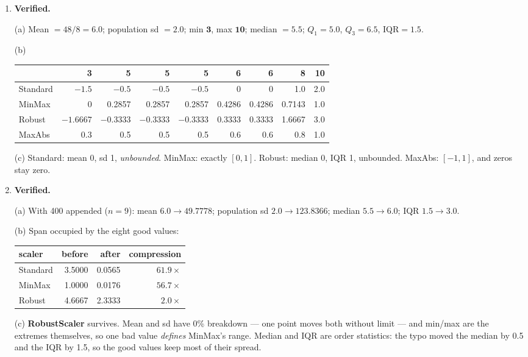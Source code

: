 \documentclass[11pt,a4paper]{article}
\newcommand{\A}[1]{\item[\textbf{#1}]}
\begin{document}
\begin{enumerate}[leftmargin=1.9cm]
\A{U4.62} \textbf{Verified.}
\begin{answerbox}
(a) Mean $= 48/8 = \mathbf{6.0}$; population sd $= \mathbf{2.0}$;
min $\mathbf{3}$, max $\mathbf{10}$; median $= \mathbf{5.5}$;
$Q_1 = \mathbf{5.0}$, $Q_3 = \mathbf{6.5}$, $\text{IQR} = \mathbf{1.5}$.

(b) \begin{center}\footnotesize\begin{tabular}{@{}lrrrrrrrr@{}}\toprule
& 3 & 5 & 5 & 5 & 6 & 6 & 8 & 10\\
\midrule
Standard & $-1.5$ & $-0.5$ & $-0.5$ & $-0.5$ & 0 & 0 & 1.0 & 2.0\\
MinMax & 0 & 0.2857 & 0.2857 & 0.2857 & 0.4286 & 0.4286 & 0.7143 & 1.0\\
Robust & $-1.6667$ & $-0.3333$ & $-0.3333$ & $-0.3333$ & 0.3333 & 0.3333 & 1.6667 & 3.0\\
MaxAbs & 0.3 & 0.5 & 0.5 & 0.5 & 0.6 & 0.6 & 0.8 & 1.0\\
\bottomrule\end{tabular}\end{center}

(c) Standard: mean 0, sd 1, \emph{unbounded}. MinMax: exactly $[0,1]$.
Robust: median 0, IQR 1, unbounded. MaxAbs: $[-1,1]$, and zeros stay zero.
\end{answerbox}

\A{U4.63} \textbf{Verified.}
\begin{answerbox}
(a) With 400 appended ($n = 9$): mean $6.0 \to \mathbf{49.7778}$;
population sd $2.0 \to \mathbf{123.8366}$; median $5.5 \to \mathbf{6.0}$;
IQR $1.5 \to \mathbf{3.0}$.

(b) Span occupied by the eight good values:
\begin{center}\begin{tabular}{@{}lrrr@{}}\toprule
scaler & before & after & compression\\
\midrule
Standard & 3.5000 & 0.0565 & $\mathbf{61.9\times}$\\
MinMax & 1.0000 & 0.0176 & $\mathbf{56.7\times}$\\
Robust & 4.6667 & 2.3333 & $\mathbf{2.0\times}$\\
\bottomrule\end{tabular}\end{center}

(c) \textbf{RobustScaler} survives. Mean and sd have 0\% breakdown --- one
point moves both without limit --- and min/max are the extremes themselves, so
one bad value \emph{defines} MinMax's range. Median and IQR are order
statistics: the typo moved the median by 0.5 and the IQR by 1.5, so the good
values keep most of their spread.


\end{answerbox}
\end{enumerate}
\end{document}
